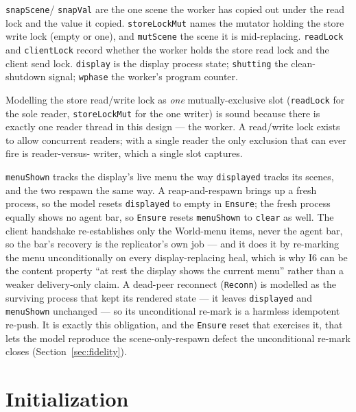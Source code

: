 \documentclass[a4paper,10pt,fleqn]{article}
\begin{document}
\texttt{snapScene}/%
\texttt{snapVal} are the one scene the worker has copied out under the read
lock and the value it copied.  \texttt{storeLockMut} names the mutator
holding the store write lock (empty or one), and \texttt{mutScene} the scene
it is mid-replacing.  \texttt{readLock} and \texttt{clientLock} record
whether the worker holds the store read lock and the client send lock.
\texttt{display} is the display process state; \texttt{shutting} the
clean-shutdown signal; \texttt{wphase} the worker's program counter.

Modelling the store read/write lock as \emph{one} mutually-exclusive slot
(\texttt{readLock} for the sole reader, \texttt{storeLockMut} for the one
writer) is sound because there is exactly one reader thread in this design
--- the worker.  A read/write lock exists to allow concurrent readers; with
a single reader the only exclusion that can ever fire is reader-versus-%
writer, which a single slot captures.

\texttt{menuShown} tracks the display's live menu the way \texttt{displayed}
tracks its scenes, and the two respawn the same way.  A reap-and-respawn brings
up a fresh process, so the model resets \texttt{displayed} to empty in
\texttt{Ensure}; the fresh process equally shows no agent bar, so \texttt{Ensure}
resets \texttt{menuShown} to \texttt{clear} as well.  The client handshake
re-establishes only the World-menu items, never the agent bar, so the bar's
recovery is the replicator's own job --- and it does it by re-marking the menu
unconditionally on every display-replacing heal, which is why I6 can be the
content property ``at rest the display shows the current menu'' rather than a
weaker delivery-only claim.  A dead-peer reconnect (\texttt{Reconn}) is
modelled as the surviving process that kept its rendered state --- it leaves
\texttt{displayed} and \texttt{menuShown} unchanged --- so its unconditional
re-mark is a harmless idempotent re-push.  It is exactly this obligation, and
the \texttt{Ensure} reset that exercises it, that lets the model reproduce the
scene-only-respawn defect the unconditional re-mark closes
(Section~\ref{sec:fidelity}).

\section{Initialization}
\end{document}
